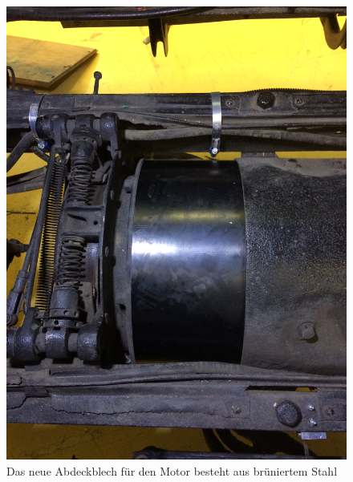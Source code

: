 \begin{landscape}
\begin{figure}[h]
		\includegraphics[angle=180,width=1.30\textwidth]{images/Anhang/Abdeckung.jpg}
	\caption{Das neue Abdeckblech für den Motor besteht aus brüniertem Stahl}
	\label{fig:Abdeckung}
\end{figure}\end{landscape}
